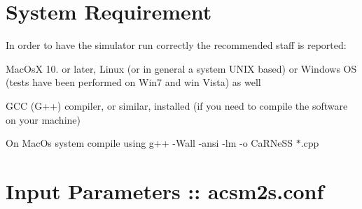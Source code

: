 \par
\par
 \hypertarget{a00002_sysreq}{}\section{System Requirement}\label{a00002_sysreq}


 In order to have the simulator run correctly the recommended staff is reported\-:
\begin{DoxyItemize}
\item Mac\-Os\-X 10. or later, Linux (or in general a system U\-N\-I\-X based) or Windows O\-S (tests have been performed on Win7 and win Vista) as well
\item G\-C\-C (G++) compiler, or similar, installed (if you need to compile the software on your machine)
\end{DoxyItemize}

On Mac\-Os system compile using {\ttfamily g++} -\/\-Wall -\/ansi -\/lm -\/o Ca\-R\-Ne\-S\-S $\ast$.cpp \par
\par
 \hypertarget{a00002_parameters}{}\section{Input Parameters \-:: acsm2s.\-conf}\label{a00002_parameters}


